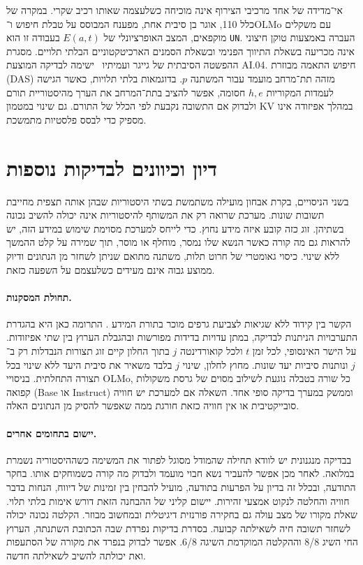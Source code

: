 \documentclass[11pt,a4paper]{article}
\DeclareRobustCommand{\textenglish}[1]{\foreignlanguage{english}{#1}}
\theoremstyle{definition}
\begin{document}
אי־מדידה של אחד מרכיבי הצירוף אינה מוכיחה כשלעצמה שאותו רכיב שקרי. במקרה של כלל 110, אוגר בן סיבית אחת, מפענח המבוסס על טבלת חיפוש ו־\textenglish{OLMo} עם משקלים מוקפאים, המצב האופרציונלי של $E(a,t)$ בעבודה זו הוא \textenglish{\texttt{UN}}. העברה באמצעות טוקן חיצוני אינה מכריעה בשאלת התיווך הפנימי ובשאלת הסמנים הארכיטקטוניים הבלתי תלויים. מסגרת ההפשטה הסיבתית של גייגר ועמיתיו~\cite{geiger2025} ישימה לבדיקה המוצעת \textenglish{AI.04}. חיפוש התאמה מבוזרת (\textenglish{DAS}) מזהה תת־מרחב מועמד עבור המשתנה $p$. בדוגמאות בלתי תלויות, כאשר הגישה לעמדות המקוריות $h,e$ חסומה, אפשר להציב בתת־המרחב את הערך מהיסטוריית תורם ולבדוק אם התשובה נקבעת לפי הכלל של התורם. גם שינוי במטמון \textenglish{KV} במהלך אפיזודה אינו מספיק כדי לבסס פלסטיות מתמשכת.

\section{דיון וכיוונים לבדיקות נוספות}
בשני הניסויים, בקרת אבחון מועילה משתמשת בשתי היסטוריות שבהן אותה תצפית מחייבת תשובות שונות. מערכת שרואה רק את המשותף להיסטוריות אינה יכולה להשיב נכונה בשתיהן. זוג כזה קובע איזה מידע נחוץ. כדי לייחס למערכת מסוימת שימוש במידע הזה, יש להראות גם מה קורה כאשר הנשא שלו נמסר, מוחלף או מוסר, תוך שמירה על קלט ההמשך ללא שינוי. כיסוי גאומטרי של חרוט תלות, משתנה מתואם שניתן לשחזר מן הנתונים ודיוק ממוצע גבוה אינם מעידים כשלעצמם על השפעה כזאת.

\paragraph{תחולת המסקנות.}
הקשר בין קידוד ללא שגיאות לצביעת גרפים מוכר בתורת המידע \cite{witsenhausen,charpenay}. התרומה כאן היא בהגדרת התערבויות הניתנות לבדיקה, במתן עדויות בדידות מפורשות ובהגבלת הערוץ בין שתי אפיזודות. על הישר האינסופי, לכל זמן $t$ ולכל קואורדינטה $j$ בתוך החלון קיים זוג תצורות הנבדלות רק ב־$j$ ונותנות סיביות יעד שונות. מחוץ לחלון, שינוי $j$ בלבד משאיר את סיבית היעד ללא שינוי בכל תצורה התחלתית. בניסויי \textenglish{OLMo}, כל שורה בטבלה נוגעת לשילוב מסוים של גרסת משקולות קפואה (\textenglish{Base} או \textenglish{Instruct}) וממשק במערך בדיקה סופי אחד. השאלה אם למערכת יש חוויה סובייקטיבית או אין חוויה כזאת חורגת ממה שאפשר להסיק מן הנתונים האלה.

\paragraph{יישום בתחומים אחרים.}
בבדיקה מנגנונית יש לוודא תחילה שהמודל מסוגל לפתור את המשימה כשההיסטוריה נשמרת במלואה. לאחר מכן אפשר להעביר נשא חבוי מועמד ולבדוק מה קורה כשמוחקים אותו. בחקר התודעה, ובכלל זה בדיון על הפרעות בתודעה, מועיל להבחין בין זמינות של דיווח, הנחות בדבר חוויה והחלטה לנקוט אמצעי זהירות. יישום קליני של ההבחנה הזאת דורש אימות בלתי תלוי. שאלת מקורו של מצב עולה גם בחקירה פורנזית דיגיטלית ובמחשוב מבוזר. הקלטה נכונה יכולה לשחזר תשובה חיה לשאילתה קבועה. בסדרת בדיקות נפרדת שבה הכתובת השתנתה, הערוץ החי השיג 8/8 וההקלטה המוקדמת השיגה 6/8. אפשר לבדוק בנפרד את מקורה של הסתעפות ואת יכולתה להשיב לשאילתה חדשה.
\end{document}
